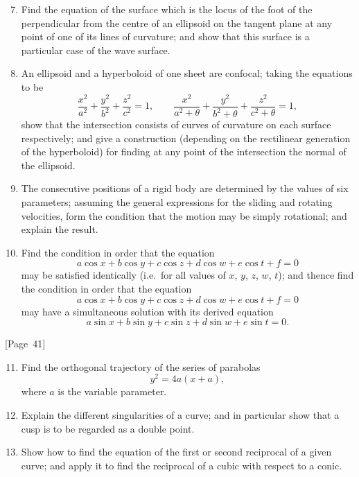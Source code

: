 \documentclass[11pt,a4paper]{article}
\theoremstyle{plain}
\theoremstyle{definition}
\theoremstyle{remark}
\begin{document}
\begin{enumerate}
\setcounter{enumi}{6}
\item Find the equation of the surface which is the locus of the
foot of the perpendicular from the centre of an ellipsoid on the tangent
plane at any point of one of its lines of curvature; and show that this
surface is a particular case of the wave surface.

\item An ellipsoid and a hyperboloid of one sheet are confocal; taking
the equations to be
\[
\frac{x^2}{a^2} + \frac{y^2}{b^2} + \frac{z^2}{c^2} = 1, \qquad
\frac{x^2}{a^2+\theta} + \frac{y^2}{b^2+\theta} + \frac{z^2}{c^2+\theta} = 1,
\]
show that the intersection consists of curves of curvature on each
surface respectively; and give a construction (depending on the
rectilinear generation of the hyperboloid) for finding at any point of
the intersection the normal of the ellipsoid.

\item The consecutive positions of a rigid body are determined by the
values of six parameters; assuming the general expressions for the
sliding and rotating velocities, form the condition that the motion may
be simply rotational; and explain the result.

\item Find the condition in order that the equation
\[
a\cos x + b\cos y + c\cos z + d\cos w + e\cos t + f = 0
\]
may be satisfied identically (i.e.\ for all values of $x$, $y$, $z$, $w$, $t$);
and thence find the condition in order that the equation
\[
a\cos x + b\cos y + c\cos z + d\cos w + e\cos t + f = 0
\]
may have a simultaneous solution with its derived equation
\[
a\sin x + b\sin y + c\sin z + d\sin w + e\sin t = 0.
\]
\end{enumerate}

\begin{center}
[Page~41]
\end{center}

\begin{enumerate}
\setcounter{enumi}{10}
\item Find the orthogonal trajectory of the series of parabolas
\[
y^2 = 4a(x+a),
\]
where $a$ is the variable parameter.

\item Explain the different singularities of a curve; and in particular
show that a cusp is to be regarded as a double point.

\item Show how to find the equation of the first or second reciprocal
of a given curve; and apply it to find the reciprocal of a cubic with
respect to a conic.
\end{enumerate}
\end{document}
